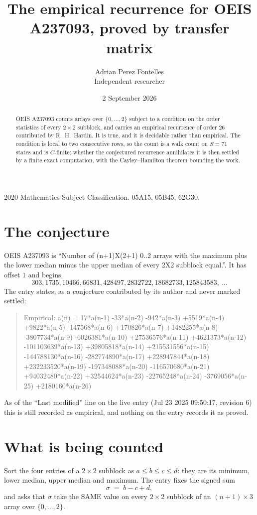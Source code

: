 \documentclass[11pt,a4paper]{article}
\title{The empirical recurrence for OEIS A237093, proved by transfer matrix}
\author{Adrian Perez Fontelles\\ \small Independent researcher}
\date{2 September 2026}
\theoremstyle{plain}
\theoremstyle{definition}
\begin{document}
\maketitle

\begin{abstract}
OEIS A237093 counts arrays over $\{0,\dots,2\}$ subject to a condition on the order
statistics of every $2\times2$ subblock, and carries an empirical recurrence of order
$26$ contributed by R.~H.~Hardin. It is true, and it is decidable rather than empirical.
The condition is local to two consecutive rows, so the count is a walk count on $S=71$
states and is $C$-finite; whether the conjectured recurrence annihilates it is then settled by
a finite exact computation, with the Cayley--Hamilton theorem bounding the work.
\end{abstract}

\noindent\small 2020 Mathematics Subject Classification. 05A15, 05B45, 62G30.\normalsize

\section{The conjecture}

OEIS A237093 is ``Number of (n+1)X(2+1) 0..2 arrays with the maximum plus the lower median minus the upper median of every 2X2 subblock equal.''. It has offset $1$ and begins
\[
303, 1735, 10466, 66831, 428497, 2832722, 18682733, 125843583,\ \dots
\]
The entry states, as a conjecture contributed by its author and never marked settled:
\begin{quote}
Empirical: a(n) = 17*a(n-1) -33*a(n-2) -942*a(n-3) +5519*a(n-4) +9822*a(n-5) -147568*a(n-6) +170826*a(n-7) +1482255*a(n-8) -3807734*a(n-9) -6026381*a(n-10) +27536576*a(n-11) +4621373*a(n-12) -101103639*a(n-13) +39805818*a(n-14) +215531556*a(n-15) -144788130*a(n-16) -282774890*a(n-17) +228947844*a(n-18) +232233520*a(n-19) -197348088*a(n-20) -116570680*a(n-21) +94032480*a(n-22) +32544624*a(n-23) -22765248*a(n-24) -3769056*a(n-25) +2180160*a(n-26)
\end{quote}
As of the ``Last modified'' line on the live entry (Jul 23 2025 09:50:17, revision 6) this is still
recorded as empirical, and nothing on the entry records it as proved.

\section{What is being counted}

Sort the four entries of a $2\times2$ subblock as $a\le b\le c\le d$: they
are its minimum, lower median, upper median and maximum. The entry fixes the signed sum
\[
\sigma\;=\;b-c+d,
\]
and asks that $\sigma$ take the SAME value on every $2\times2$ subblock of an
$(n+1)\times3$ array over $\{0,\dots,2\}$.
\end{document}
